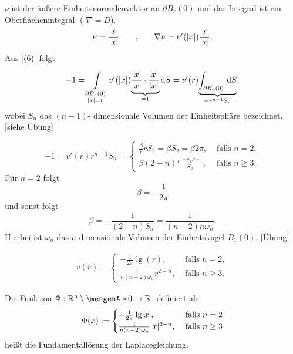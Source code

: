 $\nu$ ist der äußere Einheitsnormalenvektor an $\partial B_r(0)$ und das Integral ist ein Oberflächenintegral. ( $  \nabla  = D$). \\
\[
	\nu = \frac{x}{\lvert x\rvert} \qquad \text{,} \qquad  \nabla  u = \nu'(\lvert x\rvert) \frac{x}{\lvert x\rvert}.
\]
Aus \eqref{(6)} folgt 
\begin{equation}
	-1 = \int\limits_{\substack{\partial B_r(0)\\ \lvert x\rvert=r}}^{} v'(\lvert x\rvert) \underset{=1}{\underbrace{\frac{x}{\lvert x\rvert} \cdot \frac{x}{\lvert x\rvert}}} \,\mathrm{d}S  
	= v'(r) \underset{= r^{n-1}S_n}{\underbrace{\int_{\partial B_r(0)}^{} \,\mathrm{d}S }},
\end{equation}
wobei $S_n$ das $(n-1)$- dimensionale Volumen der Einheitsphäre bezeichnet. [siehe Übung]

\begin{equation}
	-1 = v'(r) r^{n-1} S_n = \begin{cases}
		\frac{\beta}{r}r S_2 = \beta S_2 = \beta 2 \pi, &\text{ falls } n=2,\\
		\beta (2-n) \frac{r^{1-n}r^{n-1} }{  S_n}, &\text{ falls } n \geq 3.
	\end{cases}
\end{equation}
Für $n=2$ folgt
\[
	\beta = - \frac{1}{2 \pi}
\] 
und sonst folgt
\[
	\beta = -\frac{1}{(2-n)S_n} = \frac{1}{(n-2)n\omega_n}.
\]
Hierbei ist $\omega_n$ das $n$-dimensionale Volumen der Einheitskugel $B_1(0)$. [Übung]

\begin{align*}
	v(r) = \begin{cases}
		-\frac{1}{2 \pi} \lg(r), &\text{ falls }n=2,\\
		\frac{1}{n (n-2) \omega_n } r^{2-n}, &\text{ falls }n \geq 3.
	\end{cases}
\end{align*}

\begin{definition}
	Die Funktion $\Phi: \mathbb{R}^n \setminus \set{0} \to \mathbb{R}$, definiert als
	\begin{equation}
		\Phi(x) := \begin{cases}
			-\frac{1}{2 \pi} \lg \lvert x\rvert, &\text{ falls }n=2\\
			\frac{1}{n (n-2) \omega_n } \lvert x\rvert^{2-n}, &\text{ falls }n \geq 3
		\end{cases}
	\end{equation}
	heißt die Fundamentallösung der Laplacegleichung.
\end{definition}

